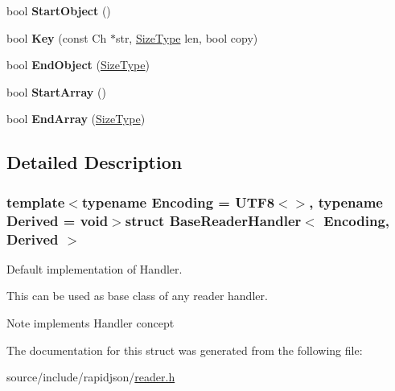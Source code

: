 \begin{DoxyCompactItemize}
\item 
\hypertarget{struct_base_reader_handler_ab0a7d9bcececb8d6ed748656f67f4917}{}bool {\bfseries Start\+Object} ()\label{struct_base_reader_handler_ab0a7d9bcececb8d6ed748656f67f4917}

\item 
\hypertarget{struct_base_reader_handler_abc50b2e7e411b7b731715e05cd01e2eb}{}bool {\bfseries Key} (const Ch $\ast$str, \hyperlink{rapidjson_8h_a5ed6e6e67250fadbd041127e6386dcb5}{Size\+Type} len, bool copy)\label{struct_base_reader_handler_abc50b2e7e411b7b731715e05cd01e2eb}

\item 
\hypertarget{struct_base_reader_handler_a0406cee0af26bc3a0b7fb2414537b0ab}{}bool {\bfseries End\+Object} (\hyperlink{rapidjson_8h_a5ed6e6e67250fadbd041127e6386dcb5}{Size\+Type})\label{struct_base_reader_handler_a0406cee0af26bc3a0b7fb2414537b0ab}

\item 
\hypertarget{struct_base_reader_handler_a9dbb1143a250a904bb18a174553a3a00}{}bool {\bfseries Start\+Array} ()\label{struct_base_reader_handler_a9dbb1143a250a904bb18a174553a3a00}

\item 
\hypertarget{struct_base_reader_handler_ae9d60a8779b6a77a7f283d64961879fb}{}bool {\bfseries End\+Array} (\hyperlink{rapidjson_8h_a5ed6e6e67250fadbd041127e6386dcb5}{Size\+Type})\label{struct_base_reader_handler_ae9d60a8779b6a77a7f283d64961879fb}

\end{DoxyCompactItemize}


\subsection{Detailed Description}
\subsubsection*{template$<$typename Encoding = U\+T\+F8$<$$>$, typename Derived = void$>$struct Base\+Reader\+Handler$<$ Encoding, Derived $>$}

Default implementation of Handler. 

This can be used as base class of any reader handler. \begin{DoxyNote}{Note}
implements Handler concept 
\end{DoxyNote}


The documentation for this struct was generated from the following file\+:\begin{DoxyCompactItemize}
\item 
source/include/rapidjson/\hyperlink{reader_8h}{reader.\+h}\end{DoxyCompactItemize}

